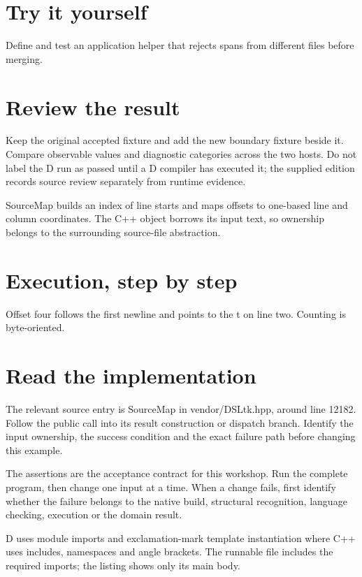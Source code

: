 \section*{Try it yourself}
Define and test an application helper that rejects spans from different files before merging.

\section*{Review the result}
Keep the original accepted fixture and add the new boundary fixture beside it. Compare observable values and diagnostic categories across the two hosts. Do not label the D run as passed until a D compiler has executed it; the supplied edition records source review separately from runtime evidence.

\clearpage
{}
SourceMap builds an index of line starts and maps offsets to one-based line and column coordinates. The C++ object borrows its input text, so ownership belongs to the surrounding source-file abstraction.


\section*{Execution, step by step}
Offset four follows the first newline and points to the t on line two. Counting is byte-oriented.

\section*{Read the implementation}
The relevant source entry is SourceMap in vendor/DSLtk.hpp, around line 12182. Follow the public call into its result construction or dispatch branch. Identify the input ownership, the success condition and the exact failure path before changing this example.

The assertions are the acceptance contract for this workshop. Run the complete program, then change one input at a time. When a change fails, first identify whether the failure belongs to the native build, structural recognition, language checking, execution or the domain result.

\clearpage
{}
D uses module imports and exclamation-mark template instantiation where C++ uses includes, namespaces and angle brackets. The runnable file includes the required imports; the listing shows only its main body.

